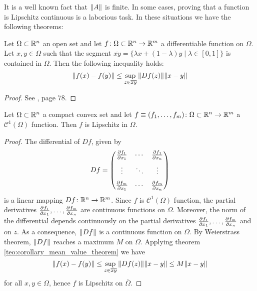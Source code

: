 \noindent
It is a well known fact that $\norm{A}$ is finite. In some cases, proving that a
function is Lipschitz continuous is a laborious task. In these situations we
have the following theorems:

\begin{theorem}
	\label{teo:corollary_mean_value_theorem} Let $\Omega \subset \mathbb{R}^n$ an
	open set and let $f \colon \Omega \subset \mathbb{R}^n \to \mathbb{R}^m$ a
	differentiable function on $\Omega$. Let $x, y \in \Omega$ such
	that the segment $\overline{xy} = \{ \lambda x + (1 -
	\lambda) y \mid \lambda \in [0, 1] \}$ is contained in $\Omega$. Then
	the following inequality holds:
	\begin{equation*}
		\norm{f(x) - f(y)} \leq \sup_{z \in 
		\overline{xy}} \norm{D f(z)} \norm{x - y}
	\end{equation*}
\end{theorem}
\begin{proof}
	See \cite{mazon2008calculo}, page 78.
\end{proof}

\begin{theorem} \label{teo:c1_function_implies_lipschitz} Let $\Omega \subset
	\mathbb{R}^n$ a compact convex set and let $f \equiv (f_1, \ldots, f_m) \colon
	\Omega \subset \mathbb{R}^n \to \mathbb{R}^m$ a $\mathcal{C}^1(\Omega)$ function. Then
	$f$ is Lipschitz in $\Omega$.
\end{theorem}
\begin{proof}
	The differential of $D f$, given by
	\begin{equation*}
		D f = 
		\begin{pmatrix}
			\pdv{f_1}{x_1} & \cdots & \pdv{f_1}{x_n} \\[6pt]
			\vdots & \ddots & \vdots \\[6pt]
			\pdv{f_m}{x_1} & \cdots & \pdv{f_m}{x_n} \\
		\end{pmatrix}
	\end{equation*}
	is a linear mapping $D f \colon \mathbb{R}^n \rightarrow \mathbb{R}^m$. Since $f$ is
	$\mathcal{C}^1(\Omega)$ function, the partial derivatives $\pdv{f_1}{x_1},
	\ldots, \pdv{f_m}{x_n}$ are continuous functions on $\Omega$. Moreover, the
	norm of the differential depends continuously on the partial derivatives
	$\pdv{f_1}{x_1}, \ldots, \pdv{f_m}{x_n}$ and on $z$. As a consequence,
	$\norm{D f}$ is a continuous function on $\Omega$. By Weierstrass theorem,
	$\norm{D f}$ reaches a maximum $M$ on $\Omega$. Applying theorem
	\ref{teo:corollary_mean_value_theorem} we have 
	\begin{equation*}
		\norm{f(x) - f(y)} \leq \sup_{z \in 
		\overline{xy}} \norm{D f(z)} \norm{x - y} \leq
		M \norm{x - y}
	\end{equation*}
	for all $x, y \in \Omega$, hence $f$ is Lipschitz on
	$\overline{\Omega}$.
\end{proof}


